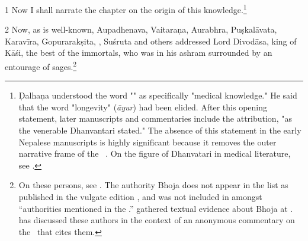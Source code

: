 \begin{translation}
    
    \item[1] Now I shall narrate the chapter on the origin of this
    knowledge.\footnote{Ḍalhaṇa understood the word "" as
    specifically "medical knowledge." He said that the word "longevity"
    (\emph{āyur})  had been elided.
    After this opening statement, later manuscripts and commentaries include
    the attribution, "as the venerable Dhanvantari stated."  The absence of this
    statement in the early Nepalese manuscripts is highly significant because it 
    removes
    the outer narrative frame of the \SS\
    \parencites[148]{wuja-2013}[\S\,3.1.2]{kleb-2021b}{rai-2019}{birc-2021}.  On 
    the 
    figure of Dhanvatari in 
    medical literature, see \cite[IA 358--361]{meul-hist}.} %
    
    \item[2] Now, as is well-known, Aupadhenava, Vaitaraṇa, Aurabhra, Puṣkalāvata,
    Karavīra, Gopurarakṣita, \diff{Bhoja}, Suśruta and others addressed Lord 
    Divodāsa,
    king of Kāśi, the best of the immortals, who was in his ashram surrounded by
    an entourage of sages.\footnote{On these persons, see \cite[IA
    361--363, 369\,ff.]{meul-hist}. The authority Bhoja does not appear in the list as
    published in the vulgate edition \citep[1]{susr-trikamji2}, and was not
    included in \cite{meul-hist} amongst “authorities mentioned in the \SS.” 
    \citeauthor{meul-hist} gathered textual evidence about Bhoja at \cite[IA
    690--691]{meul-hist}. \citet{kleb-2021a} has discussed these authors in the
    context of an anonymous commentary on the \SS\ that cites them.}
    
    \nocite{emen-1969}
    
    

\end{translation}
